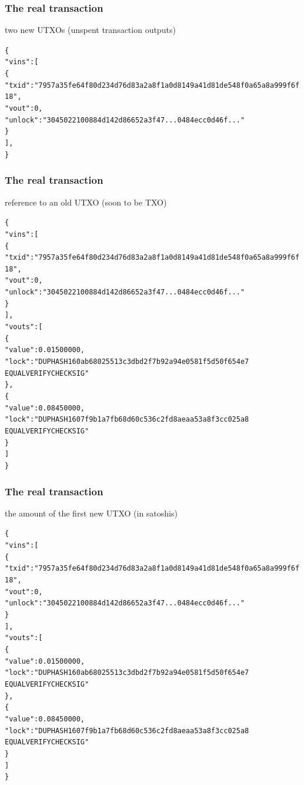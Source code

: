 \documentclass[11pt]{beamer}  %
\begin{document}
\begin{frame}[fragile]\frametitle{The real transaction}

  \begin{center}
    two new UTXOs (unspent transaction outputs)
  \end{center}

  {\scriptsize\begin{alltt}
\{
  "vins": [
    \{
      "txid": "7957a35fe64f80d234d76d83a2a8f1a0d8149a41d81de548f0a65a8a999f6f18",
      "vout": 0,
      "unlock": "3045022100884d142d86652a3f47... 0484ecc0d46f..."
    \}
  ],
\}
\end{alltt}}

\end{frame}

\begin{frame}[fragile]\frametitle{The real transaction}

  \begin{center}
    reference to an old UTXO (soon to be TXO)
  \end{center}

  {\scriptsize\begin{alltt}
\{
  \alert{"vins": [
    \{
      "txid": "7957a35fe64f80d234d76d83a2a8f1a0d8149a41d81de548f0a65a8a999f6f18",
      "vout": 0,
      "unlock": "3045022100884d142d86652a3f47... 0484ecc0d46f..."
    \}
  ]},
  "vouts": [
    \{
      "value": 0.01500000,
      "lock": "DUP HASH160 ab68025513c3dbd2f7b92a94e0581f5d50f654e7
               EQUALVERIFY CHECKSIG"
    \},
    \{
      "value": 0.08450000,
      "lock": "DUP HASH160 7f9b1a7fb68d60c536c2fd8aeaa53a8f3cc025a8
               EQUALVERIFY CHECKSIG"
    \}
  ]
\}
\end{alltt}}

\end{frame}

\begin{frame}[fragile]\frametitle{The real transaction}

  \begin{center}
    the amount of the first new UTXO (in satoshis)
  \end{center}

  {\scriptsize\begin{alltt}
\{
  "vins": [
    \{
      "txid": "7957a35fe64f80d234d76d83a2a8f1a0d8149a41d81de548f0a65a8a999f6f18",
      "vout": 0,
      "unlock": "3045022100884d142d86652a3f47... 0484ecc0d46f..."
    \}
  ],
  "vouts": [
    \{
      \alert{"value": 0.01500000},
      "lock": "DUP HASH160 ab68025513c3dbd2f7b92a94e0581f5d50f654e7
               EQUALVERIFY CHECKSIG"
    \},
    \{
      "value": 0.08450000,
      "lock": "DUP HASH160 7f9b1a7fb68d60c536c2fd8aeaa53a8f3cc025a8
               EQUALVERIFY CHECKSIG"
    \}
  ]
\}
\end{alltt}}

\end{frame}
\end{document}
